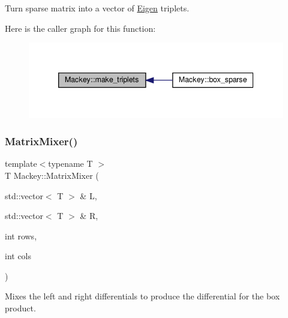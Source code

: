 Turn sparse matrix into a vector of \hyperlink{namespaceEigen}{Eigen} triplets. 

Here is the caller graph for this function\+:\nopagebreak
\begin{figure}[H]
\begin{center}
\leavevmode
\includegraphics[width=339pt]{namespaceMackey_a114f8d4069f6e5964f07c2fec3bdc9b7_icgraph}
\end{center}
\end{figure}
\mbox{\label{namespaceMackey_a1c34295db9666bc7e86b2972c345d291}} 
\subsubsection{\texorpdfstring{Matrix\+Mixer()}{MatrixMixer()}}
{\footnotesize\ttfamily template$<$typename T $>$ \\
T Mackey\+::\+Matrix\+Mixer (\begin{DoxyParamCaption}\item[{std\+::vector$<$ T $>$ \&}]{L,  }\item[{std\+::vector$<$ T $>$ \&}]{R,  }\item[{int}]{rows,  }\item[{int}]{cols }\end{DoxyParamCaption})}



Mixes the left and right differentials to produce the differential for the box product. 

